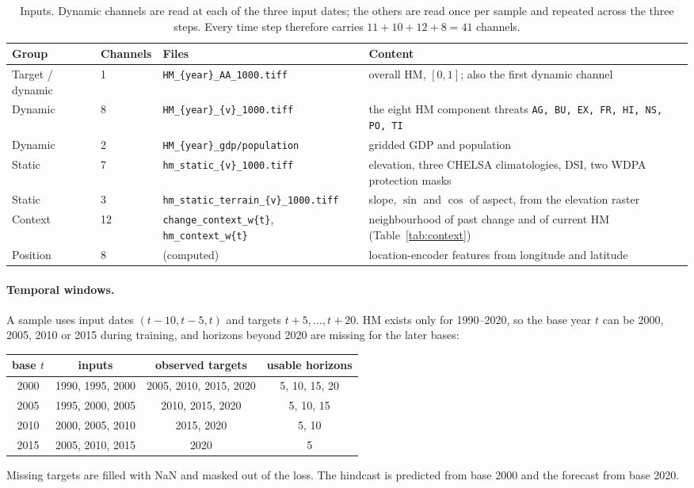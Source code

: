 \documentclass[11pt,a4paper]{article}
\newcommand{\code}[1]{\texttt{\small #1}}
\begin{document}
\begin{table}[h]
\centering\small
\setlength{\tabcolsep}{4pt}\begin{tabular}{@{}llp{4.6cm}p{5.6cm}@{}}
\toprule
Group & Channels & Files & Content \\
\midrule
Target / dynamic & 1 & \code{HM\_\{year\}\_AA\_1000.tiff} & overall HM, $[0,1]$; also the first dynamic channel \\
Dynamic & 8 & \code{HM\_\{year\}\_\{v\}\_1000.tiff} & the eight HM component threats \code{AG, BU, EX, FR, HI, NS, PO, TI} \\
Dynamic & 2 & \code{HM\_\{year\}\_gdp/population} & gridded GDP \citep{murakami} and population \citep{zhuang} \\
Static & 7 & \code{hm\_static\_\{v\}\_1000.tiff} & elevation, three CHELSA climatologies, DSI, two WDPA protection masks \\
Static & 3 & \code{hm\_static\_terrain\_}\newline\code{\{v\}\_1000.tiff} & slope, $\sin$ and $\cos$ of aspect, from the elevation raster \\
Context & 12 & \code{change\_context\_w\{t\}}, \code{hm\_context\_w\{t\}} & neighbourhood of past change and of current HM (Table~\ref{tab:context}) \\
Position & 8 & (computed) & location-encoder features from longitude and latitude \\
\bottomrule
\end{tabular}
\caption{Inputs. Dynamic channels are read at each of the three input dates; the others are read
once per sample and repeated across the three steps. Every time step therefore carries
$11+10+12+8=41$ channels.}
\label{tab:inputs}
\end{table}

\paragraph{Temporal windows.} A sample uses input dates $(t-10,t-5,t)$ and targets
$t+5,\dots,t+20$. HM exists only for 1990--2020, so the base year $t$ can be 2000, 2005, 2010 or
2015 during training, and horizons beyond 2020 are missing for the later bases:
\begin{center}\small
\begin{tabular}{@{}cccc@{}}
\toprule
base $t$ & inputs & observed targets & usable horizons \\
\midrule
2000 & 1990, 1995, 2000 & 2005, 2010, 2015, 2020 & 5, 10, 15, 20 \\
2005 & 1995, 2000, 2005 & 2010, 2015, 2020 & 5, 10, 15 \\
2010 & 2000, 2005, 2010 & 2015, 2020 & 5, 10 \\
2015 & 2005, 2010, 2015 & 2020 & 5 \\
\bottomrule
\end{tabular}
\end{center}
Missing targets are filled with NaN and masked out of the loss. The hindcast is predicted from
base 2000 and the forecast from base 2020.
\end{document}
